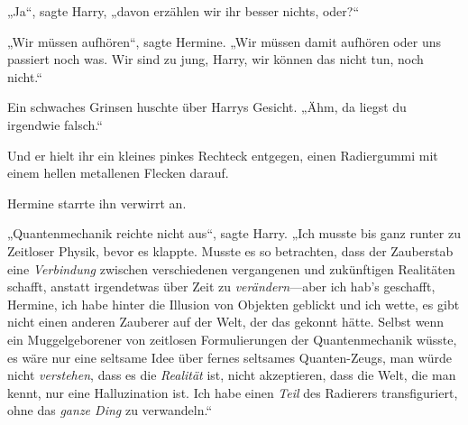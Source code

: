 „Ja“, sagte Harry, „davon erzählen wir ihr besser nichts, oder?“

„Wir müssen aufhören“, sagte Hermine. „Wir müssen damit aufhören oder uns passiert noch was. Wir sind zu jung, Harry, wir können das nicht tun, noch nicht.“

Ein schwaches Grinsen huschte über Harrys Gesicht. „Ähm, da liegst du irgendwie falsch.“

Und er hielt ihr ein kleines pinkes Rechteck entgegen, einen Radiergummi mit einem hellen metallenen Flecken darauf.

Hermine starrte ihn verwirrt an.

„Quantenmechanik reichte nicht aus“, sagte Harry. „Ich musste bis ganz runter zu Zeitloser Physik, bevor es klappte. Musste es so betrachten, dass der Zauberstab eine \emph{Verbindung} zwischen verschiedenen vergangenen und zukünftigen Realitäten schafft, anstatt irgendetwas über Zeit zu \emph{verändern}—aber ich hab’s geschafft, Hermine, ich habe hinter die Illusion von Objekten geblickt und ich wette, es gibt nicht einen anderen Zauberer auf der Welt, der das gekonnt hätte. Selbst wenn ein Muggelgeborener von zeitlosen Formulierungen der Quantenmechanik wüsste, es wäre nur eine seltsame Idee über fernes seltsames Quanten-Zeugs, man würde nicht \emph{verstehen}, dass es die \emph{Realität} ist, nicht akzeptieren, dass die Welt, die man kennt, nur eine Halluzination ist. Ich habe einen \emph{Teil} des Radierers transfiguriert, ohne das \emph{ganze Ding} zu verwandeln.“


